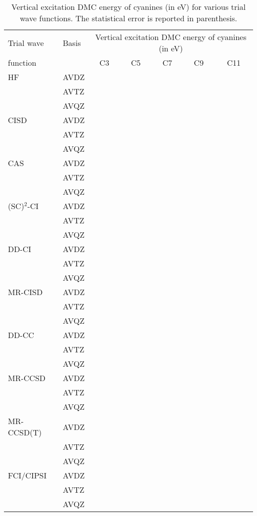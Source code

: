 \documentclass[aip,jcp,reprint,showkeys]{revtex4-1}
\newcommand{\mc}{\multicolumn}
\newcommand{\SCSC}{(SC)$^2$}
\begin{document}
\begin{table*}
	\caption{
	\label{tab:VE}
	Vertical excitation DMC energy of cyanines (in eV) for various trial wave functions.
	The statistical error is reported in parenthesis.}
	\begin{ruledtabular}
	\begin{tabular}{llccccc}
		Trial wave	&	Basis		&	\mc{5}{c}{Vertical excitation DMC energy of cyanines (in eV)}	\\
										\cline{3-7}
		function	&				&	C3		&	C5		&	C7		&	C9		&	C11		\\
					\hline
		HF			&	AVDZ		&			&			&			&			&			\\
					&	AVTZ		&			&			&			&			&			\\
					&	AVQZ		&			&			&			&			&			\\
					\hline
		CISD		&	AVDZ		&			&			&			&			&			\\
					&	AVTZ		&			&			&			&			&			\\
					&	AVQZ		&			&			&			&			&			\\
					\hline
		CAS			&	AVDZ		&			&			&			&			&			\\
					&	AVTZ		&			&			&			&			&			\\
					&	AVQZ		&			&			&			&			&			\\
					\hline
		\SCSC-CI	&	AVDZ		&			&			&			&			&			\\
					&	AVTZ		&			&			&			&			&			\\
					&	AVQZ		&			&			&			&			&			\\
					\hline
		DD-CI		&	AVDZ		&			&			&			&			&			\\
					&	AVTZ		&			&			&			&			&			\\
					&	AVQZ		&			&			&			&			&			\\
					\hline
		MR-CISD		&	AVDZ		&			&			&			&			&			\\
					&	AVTZ		&			&			&			&			&			\\
					&	AVQZ		&			&			&			&			&			\\
					\hline
		DD-CC		&	AVDZ		&			&			&			&			&			\\
					&	AVTZ		&			&			&			&			&			\\
					&	AVQZ		&			&			&			&			&			\\
					\hline
		MR-CCSD		&	AVDZ		&			&			&			&			&			\\
					&	AVTZ		&			&			&			&			&			\\
					&	AVQZ		&			&			&			&			&			\\
					\hline
		MR-CCSD(T)	&	AVDZ		&			&			&			&			&			\\
					&	AVTZ		&			&			&			&			&			\\
					&	AVQZ		&			&			&			&			&			\\
					\hline
		FCI/CIPSI	&	AVDZ		&			&			&			&			&			\\
					&	AVTZ		&			&			&			&			&			\\
					&	AVQZ		&			&			&			&			&			\\
	\end{tabular}		
	\end{ruledtabular}		
\end{table*}		
\end{document}
